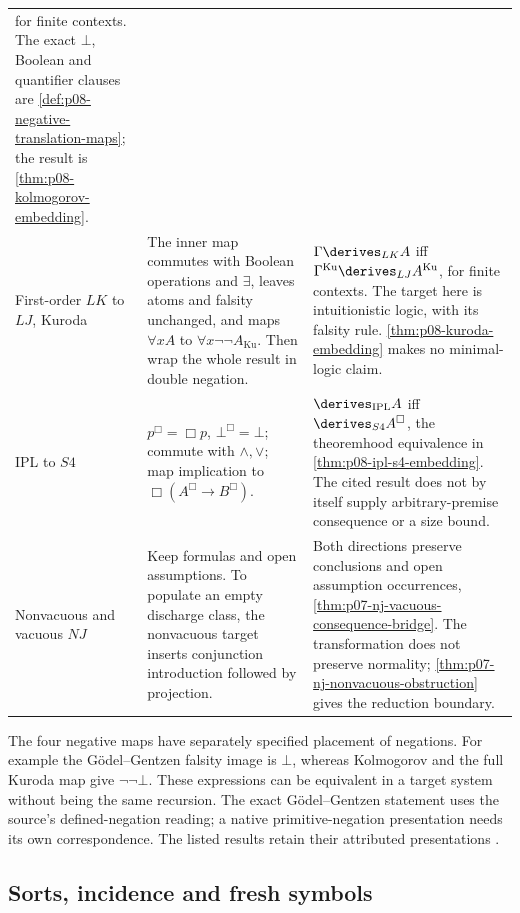\begin{longtable}{@{}p{}p{}p{}@{}}
for finite contexts. The exact \(\bot\), Boolean and quantifier clauses
are \cref{def:p08-negative-translation-maps}; the result is
\cref{thm:p08-kolmogorov-embedding}. \\
First-order \(LK\) to \(LJ\), Kuroda &
The inner map commutes with Boolean operations and \(\exists\), leaves
atoms and falsity unchanged, and maps \(\forall xA\) to
\(\forall x\neg\neg A_{\mathrm{Ku}}\). Then wrap the whole result in
double negation. &
\(\Gamma\derives_{LK}A\) iff
\(\Gamma^{\mathrm{Ku}}\derives_{LJ}A^{\mathrm{Ku}}\), for finite
contexts. The target here is intuitionistic logic, with its falsity rule.
\cref{thm:p08-kuroda-embedding} makes no minimal-logic claim. \\
IPL to \(S4\) &
\(p^{\Box}=\Box p\), \(\bot^{\Box}=\bot\); commute with
\(\land,\lor\); map implication to
\(\Box(A^{\Box}\to B^{\Box})\). &
\(\derives_{\mathrm{IPL}}A\) iff \(\derives_{S4}A^{\Box}\),
the theoremhood equivalence in \cref{thm:p08-ipl-s4-embedding}.
The cited result does not by itself supply arbitrary-premise consequence
or a size bound. \\
Nonvacuous and vacuous \(NJ\) &
Keep formulas and open assumptions. To populate an empty discharge class,
the nonvacuous target inserts conjunction introduction followed by projection. &
Both directions preserve conclusions and open assumption occurrences,
\cref{thm:p07-nj-vacuous-consequence-bridge}. The transformation does not
preserve normality; \cref{thm:p07-nj-nonvacuous-obstruction} gives the
reduction boundary. \\
\bottomrule
\end{longtable}

The four negative maps have separately specified placement of negations.
For example the G\"odel--Gentzen falsity image is \(\bot\), whereas
Kolmogorov and the full Kuroda map give \(\neg\neg\bot\).
These expressions can be equivalent in a target system without being the
same recursion. The exact G\"odel--Gentzen statement uses the source's
defined-negation reading; a native primitive-negation presentation needs
its own correspondence. The listed results retain their attributed
presentations \cite{TroelstraVanDalen1988,Glivenko1929,
Kolmogorov1925ExcludedMiddle,Kuroda1951,Godel1933}.

\subsection{Sorts, incidence and fresh symbols}

